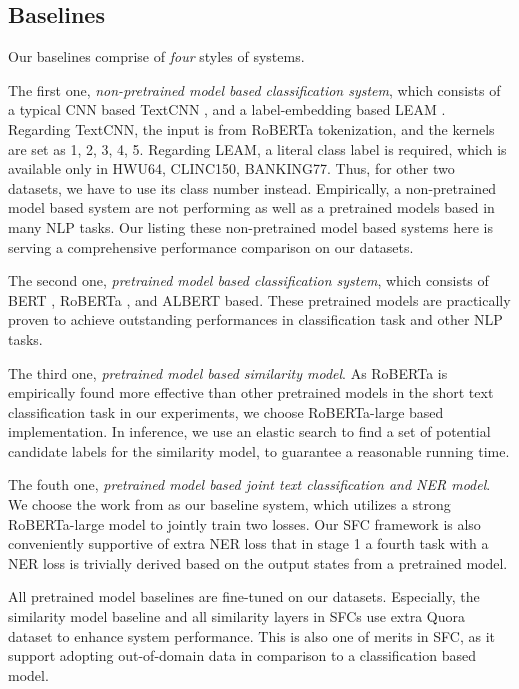 \subsection{Baselines}
Our baselines comprise of \emph{four} styles of systems. 

The first one, \emph{non-pretrained model based classification system}, which consists of a typical CNN based TextCNN \cite{kim2014convolutional}, and a label-embedding based LEAM \cite{wang2018joint}. 
Regarding TextCNN, the input is from RoBERTa tokenization, and the kernels are set as 1, 2, 3, 4, 5. 
Regarding LEAM, a literal class label is required, which is available only in HWU64, CLINC150, BANKING77. 
Thus, for other two datasets, we have to use its class number instead. 
Empirically, a non-pretrained model based system are not performing as well as a pretrained models based in many NLP tasks.
Our listing these non-pretrained model based systems here is serving a comprehensive performance comparison on our datasets.

The second one, \emph{pretrained model based classification system}, which consists of BERT \cite{devlin2018bert}, RoBERTa \cite{liu2019roberta}, and ALBERT \cite{lan2019albert} based. 
These pretrained models are practically proven to achieve outstanding performances in classification task and other NLP tasks.

The third one, \emph{pretrained model based similarity model}. 
As RoBERTa is empirically found more effective than other pretrained models in the short text classification task in our experiments, we choose RoBERTa-large based implementation.
In inference, we use an elastic search to find a set of potential candidate labels for the similarity model, to guarantee a reasonable running time.

The fouth one, \emph{pretrained model based joint text classification and NER model}. 
We choose the work from \cite{chen2019bert} as our baseline system, which utilizes a strong RoBERTa-large model to jointly train two losses.
Our SFC framework is also conveniently supportive of extra NER loss that in stage 1 a fourth task with a NER loss is trivially derived based on the output states from a pretrained model.

All pretrained model baselines are fine-tuned on our datasets.
Especially, the similarity model baseline and all similarity layers in SFCs use extra Quora dataset \cite{iyer2017first} to enhance system performance. 
This is also one of merits in SFC, as it support adopting out-of-domain data in comparison to a classification based model.

